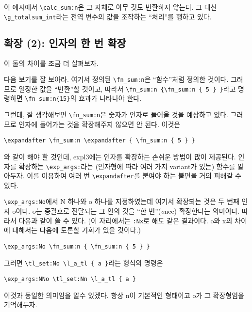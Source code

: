 \documentclass[a4paper,amsmath]{oblivoir}
\newcounter{sub}
\begin{document}
이 예시에서 \verb|\calc_sum:n|은 그 자체로 아무 것도 반환하지 않는다. 그 대신 \verb|\g_totalsum_int|라는 전역 변수의 값을 조작하는 “처리”를 행하고 있다.

\subsection*{확장 (2): 인자의 한 번 확장}

이 둘의 차이를 조금 더 살펴보자.

다음 보기를 잘 보아라. 여기서 정의된 \verb|\fn_sum:n|은 “함수”처럼 정의한 것이다.
그러므로 일정한 값을 “반환”할 것이고, 따라서 \verb|\fn_sum:n {\fn_sum:n { 5 } }|라고 명령하면 \verb|\fn_sum:n{15}|의 효과가 나타나야 한다.




그런데, 잘 생각해보면 \verb|\fn_sum:n|은 숫자가 인자로 들어올 것을 예상하고 있다. 그러므로 인자에 들어가는 것을 확장해주지 않으면 안 된다. 이것은
\begin{verbatim}
\expandafter \fn_sum:n \expandafter { \fn_sum:n { 5 } }
\end{verbatim}
와 같이 해야 할 것인데, expl3에는 인자를 확장하는 손쉬운 방법이 많이 제공된다. 인자를 확장하는  \verb|\exp_args:|라는 (인자형에 따라 여러 가지 variant가 있는) 함수를 알아두자. 이를 이용하여 여러 번 \verb|\expandafter|를 붙여야 하는 불편을 거의 피해갈 수 있다.

\verb|\exp_args:No|에서 N 하나와 o 하나를 지정하였는데 여기서 확장되는 것은 두 번째 인자 o이다. o는 중괄호로 전달되는 그 안의 것을 “한 번”(\textit{o}nce) 확장한다는 의미이다. 
따라서 다음과 같이 쓸 수 있다. (이 자리에서는 \verb|:Nx|로 해도 같은 결과이다. o와 x의 차이에 대해서는 다음에 토론할 기회가 있을 것이다.)
\begin{verbatim}
\exp_args:No \fn_sum:n { \fn_sum:n { 5 } }
\end{verbatim}

그러면 \verb|\tl_set:No \l_a_tl { a }|라는 형식의 명령은 
\begin{verbatim}
\exp_args:NNo \tl_set:Nn \l_a_tl { a }
\end{verbatim}
이것과 동일한 의미임을 알수 있겠다. 항상 n이 기본적인 형태이고 o가 그 확장형임을 기억해두자.
\end{document}

